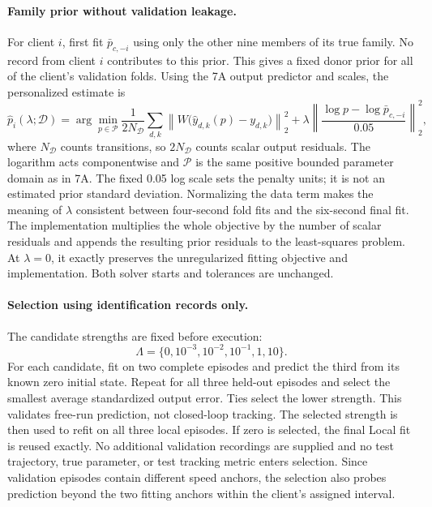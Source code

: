 \paragraph{Family prior without validation leakage.}
For client $i$, first fit $\bar p_{c,-i}$ using only the other nine members
of its true family. No record from client $i$ contributes to this prior.
This gives a fixed donor prior for all of the client's validation folds.
Using the 7A output predictor and scales, the personalized estimate is
\begin{equation}
 \hat p_i(\lambda;\mathcal D)=\arg\min_{p\in\mathcal P}
 \frac{1}{2N_{\mathcal D}}\sum_{d,k}
 \left\|W\big(\hat y_{d,k}(p)-y_{d,k}\big)\right\|_2^2
 +\lambda\left\|\frac{\log p-\log\bar p_{c,-i}}{0.05}\right\|_2^2,
 \label{eq:7bobjective}
\end{equation}
where $N_{\mathcal D}$ counts transitions, so $2N_{\mathcal D}$ counts scalar
output residuals. The logarithm acts componentwise and $\mathcal P$ is the
same positive bounded parameter domain as in 7A. The fixed 0.05 log scale
sets the penalty units; it is not an estimated prior standard deviation.
Normalizing the data term makes the meaning of $\lambda$ consistent between
four-second fold fits and the six-second final fit. The implementation
multiplies the whole objective by the number of scalar residuals and appends
the resulting prior residuals to the least-squares problem. At $\lambda=0$,
it exactly preserves the unregularized fitting objective and implementation.
Both solver starts and tolerances are unchanged.

\paragraph{Selection using identification records only.}
The candidate strengths are fixed before execution:
\begin{equation}
 \Lambda=\{0,10^{-3},10^{-2},10^{-1},1,10\}.
\end{equation}
For each candidate, fit on two complete episodes and predict the third from
its known zero initial state. Repeat for all three held-out episodes and
select the smallest average standardized output error. Ties select the lower
strength. This validates free-run prediction, not closed-loop tracking.
The selected strength is then used to refit on all three local episodes.
If zero is selected, the final Local fit is reused exactly. No additional
validation recordings are supplied and no test trajectory, true parameter,
or test tracking metric enters selection. Since validation episodes contain
different speed anchors, the selection also probes prediction beyond the
two fitting anchors within the client's assigned interval.


